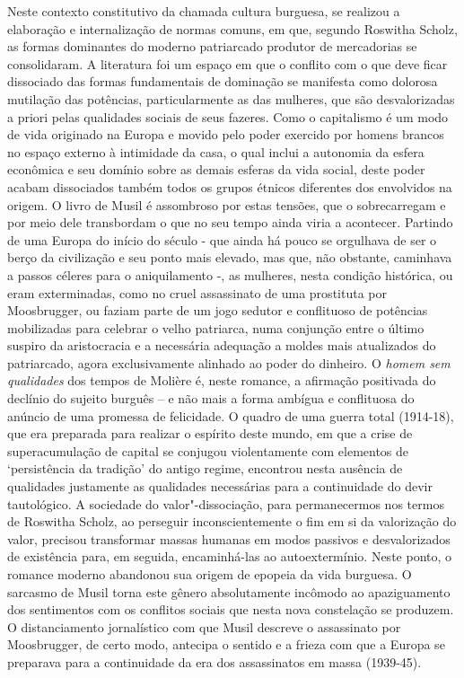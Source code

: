 Neste contexto constitutivo da chamada cultura burguesa, se realizou a
elaboração e internalização de normas comuns, em que, segundo Roswitha
Scholz, as formas dominantes do moderno patriarcado produtor de
mercadorias se consolidaram. A literatura foi um espaço em que o
conflito com o que deve ficar dissociado das formas fundamentais de
dominação se manifesta como dolorosa mutilação das potências,
particularmente as das mulheres, que são desvalorizadas a priori pelas
qualidades sociais de seus fazeres. Como o capitalismo é um modo de vida
originado na Europa e movido pelo poder exercido por homens brancos no
espaço externo à intimidade da casa, o qual inclui a autonomia da esfera
econômica e seu domínio sobre as demais esferas da vida social, deste
poder acabam dissociados também todos os grupos étnicos diferentes dos
envolvidos na origem. O livro de Musil é assombroso por estas tensões,
que o sobrecarregam e por meio dele transbordam o que no seu tempo ainda
viria a acontecer. Partindo de uma Europa do início do século  - que
ainda há pouco se orgulhava de ser o berço da civilização e seu ponto
mais elevado, mas que, não obstante, caminhava a passos céleres para o
aniquilamento -, as mulheres, nesta condição histórica, ou eram
exterminadas, como no cruel assassinato de uma prostituta por
Moosbrugger, ou faziam parte de um jogo sedutor e conflituoso de
potências mobilizadas para celebrar o velho patriarca, numa conjunção
entre o último suspiro da aristocracia e a necessária adequação a moldes
mais atualizados do patriarcado, agora exclusivamente alinhado ao poder
do dinheiro. O \emph{homem sem qualidades} dos tempos de Molière é,
neste romance, a afirmação positivada do declínio do sujeito burguês --
e não mais a forma ambígua e conflituosa do anúncio de uma promessa de
felicidade. O quadro de uma guerra total (1914-18), que era preparada
para realizar o espírito deste mundo, em que a crise de superacumulação
de capital se conjugou violentamente com elementos de `persistência da
tradição' do antigo regime, encontrou nesta ausência de qualidades
justamente as qualidades necessárias para a continuidade do devir
tautológico. A sociedade do valor"-dissociação, para permanecermos nos
termos de Roswitha Scholz, ao perseguir inconscientemente o fim em si da
valorização do valor, precisou transformar massas humanas em modos
passivos e desvalorizados de existência para, em seguida, encaminhá-las
ao autoextermínio. Neste ponto, o romance moderno abandonou sua origem
de epopeia da vida burguesa. O sarcasmo de Musil torna este gênero
absolutamente incômodo ao apaziguamento dos sentimentos com os conflitos
sociais que nesta nova constelação se produzem. O distanciamento
jornalístico com que Musil descreve o assassinato por Moosbrugger, de
certo modo, antecipa o sentido e a frieza com que a Europa se preparava
para a continuidade da era dos assassinatos em massa (1939-45).

